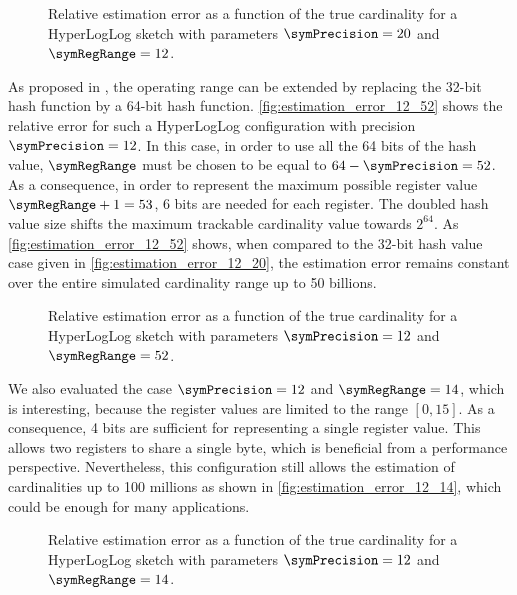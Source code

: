 \documentclass[a4paper]{scrartcl}
\begin{document}
\begin{figure}
\centering

\caption{Relative estimation error as a function of the true cardinality for a HyperLogLog sketch with parameters $\symPrecision = 20$ and $\symRegRange=12$.}
\label{fig:estimation_error_20_12}
\end{figure}

As proposed in \cite{Heule2013}, the operating range can be extended by
replacing the 32-bit hash function by a 64-bit hash function. \autoref{fig:estimation_error_12_52} shows the relative error for such a HyperLogLog configuration with precision  $\symPrecision=12$. In this case, in order to use all the 64 bits of the hash value, $\symRegRange$ must be chosen to be equal to $64 - \symPrecision = 52$. As a consequence, in order to represent the maximum possible register value $\symRegRange+1 = 53$, 6 bits are needed for each register. The doubled hash value size shifts the maximum trackable cardinality value towards $2^{64}$. As \autoref{fig:estimation_error_12_52} shows, when compared to the 32-bit hash value case given in \autoref{fig:estimation_error_12_20}, the estimation error remains constant over the entire simulated cardinality range up to 50 billions.

\begin{figure}
\centering

\caption{Relative estimation error as a function of the true cardinality for a HyperLogLog sketch with parameters $\symPrecision = 12$ and $\symRegRange=52$.}
\label{fig:estimation_error_12_52}
\end{figure}

We also evaluated the case $\symPrecision = 12$ and $\symRegRange=14$, which is interesting, because the register values are limited to the range $[0, 15]$. As a consequence, 4 bits are sufficient for representing a single register value. This allows two registers to share a single byte, which is beneficial from a performance perspective. Nevertheless, this configuration still allows the estimation of cardinalities up to 100 millions as shown in \autoref{fig:estimation_error_12_14}, which could be enough for many applications.

\begin{figure}
\centering

\caption{Relative estimation error as a function of the true cardinality for a HyperLogLog sketch with parameters $\symPrecision = 12$ and $\symRegRange=14$.}
\label{fig:estimation_error_12_14}
\end{figure}
\end{document}

